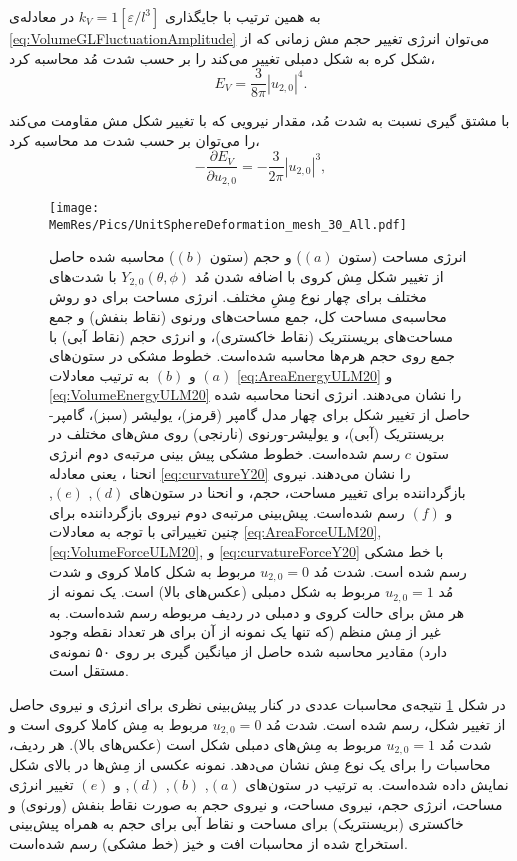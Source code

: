 به همین ترتیب با جایگذاری 
$k_V=1[\varepsilon/l^3]$
در معادله‌ی
\ref{eq:VolumeGLFluctuationAmplitude}
می‌توان انرژی تغییر حجم مش زمانی که از  شکل کره به شکل دمبلی تغییر می‌کند را بر حسب شدت مُد محاسبه کرد،
\begin{equation}
E_V= \frac{3}{8\pi}|u_{2,0}|^4.
\label{eq:VolumeEnergyULM20}
\end{equation}

با مشتق ‌گیری نسبت به شدت مُد، مقدار نیرویی که با تغییر شکل مش مقاومت می‌کند را می‌توان بر حسب شدت مد محاسبه کرد،
\begin{equation}
-\frac{\partial E_V}{\partial u_{2,0}}= -\frac{3}{2\pi}|u_{2,0}|^3,
\label{eq:VolumeForceULM20}
\end{equation}

\begin{figure}[tbp]
\begin{center}
\texttt{[image: \\MemRes/Pics/UnitSphereDeformation\_mesh\_30\_All.pdf]}
\caption{
انرژی مساحت (ستون 
$(a)$)
 و حجم (ستون 
$(b)$)
 محاسبه‌ شده حاصل از تغییر شکل مِش کروی با اضافه شدن مُد
$Y_{2,0}(\theta,\phi)$
با شدت‌های مختلف برای چهار نوع مِشِ مختلف. انرژی مساحت برای دو روش محاسبه‌ی مساحت کل، جمع مساحت‌های ورنوی (نقاط بنفش) و جمع مساحت‌های بریسنتریک (نقاط خاکستری)، و انرژی حجم (نقاط آبی) با جمع روی حجم هرم‌ها محاسبه شده‌است. خطوط مشکی در ستون‌های 
$(a)$
و
$(b)$
به ترتیب معادلات
\ref{eq:AreaEnergyULM20}
و
\ref{eq:VolumeEnergyULM20}
را نشان می‌دهند. انرژی انحنا محاسبه‌ شده حاصل از تغییر شکل برای چهار مدل گامپر (قرمز)، یولیشر (سبز)، گامپر-بریسنتریک (آبی)، و یولیشر-ورنوی (نارنجی) روی مش‌های مختلف در ستون
$c$
 رسم شده‌است. خطوط مشکی پیش بینی
 مرتبه‌ی دوم انرژی انحنا ، یعنی معادله
\ref{eq:curvatureY20}
را نشان می‌دهند. نیروی بازگرداننده برای تغییر مساحت، حجم، و انحنا در ستون‌های 
$(d)$, $(e)$,
و
$(f)$
رسم شده‌است.  پیش‌بینی‌ مرتبه‌ی دوم نیروی بازگرداننده برای چنین تغییراتی با توجه به معادلات
\ref{eq:AreaForceULM20}, \ref{eq:VolumeForceULM20}, 
و
\ref{eq:curvatureForceY20}
با خط مشکی رسم شده است. شدت مُد 
$u_{2,0}=0$
مربوط به شکل کاملا کروی و شدت مُد 
$u_{2,0}=1$
مربوط به شکل دمبلی (عکس‌های بالا) است. یک نمونه از هر مش برای حالت کروی و دمبلی در ردیف مربوطه رسم شده‌است. به غیر از مِش منظم (که تنها یک نمونه از آن برای هر تعداد نقطه وجود دارد) مقادیر محاسبه شده حاصل از میانگین گیری بر روی ۵۰ نمونه‌ی مستقل ‌است.
}
\label{fig:AllULM20}
\end{center}
\end{figure}


در شکل
\ref{fig:AllULM20}
نتیجه‌ی محاسبات عددی در کنار پیش‌بینی نظری برای انرژی و نیروی حاصل از تغییر شکل، رسم شده است. شدت مُد
$u_{2,0}=0$
مربوط به مِش کاملا کروی است و شدت مُد 
$u_{2,0}=1$
مربوط به مِش‌های دمبلی شکل است (عکس‌های بالا). هر ردیف، محاسبات را برای یک نوع مِش نشان می‌دهد. نمونه‌ عکسی از مِش‌ها در بالای شکل نمایش داده‌ شده‌است. به ترتیب در ستون‌های 
$(a)$, $(b)$, $(d)$, 
 و
$(e)$
تغییر انرژی مساحت، انرژی حجم، نیروی مساحت، و نیروی حجم به صورت نقاط بنفش (ورنوی) و خاکستری (بریسنتریک) برای مساحت و نقاط آبی برای حجم به همراه پیش‌بینی استخراج شده از محاسبات افت و خیز (خط مشکی) رسم شده‌است. 

